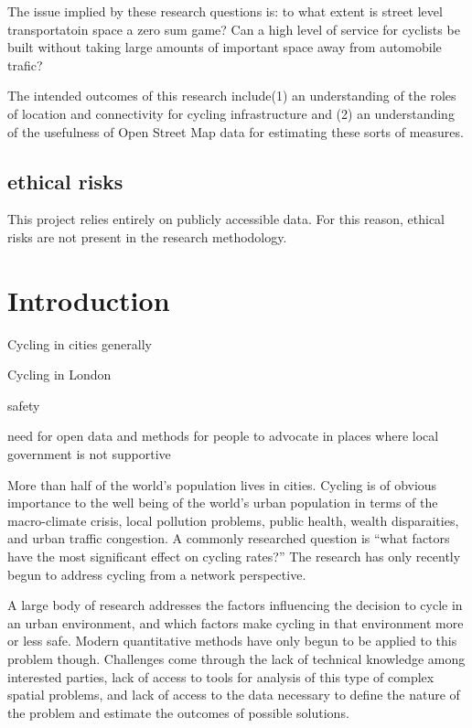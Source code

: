 \documentclass[11pt]{article} %
\begin{document}
The issue implied by these research questions is: to what extent is street level transportatoin space a zero sum game? Can a high level of service for cyclists be built without taking large amounts of important space away from automobile trafic? 

The intended outcomes of this research include(1) an understanding of the roles of location and connectivity for cycling infrastructure and (2) an understanding of the usefulness of Open Street Map data for estimating these sorts of measures. 


\subsection{ethical risks}

This project relies entirely on publicly accessible data. For this reason, ethical risks are not present in the research methodology.  

\section{Introduction}

Cycling in cities generally

Cycling in London

safety

need for open data and methods for people to advocate in places where local government is not supportive

More than half of the world's population lives in cities. Cycling is of obvious importance to the well being of the world's  urban population in terms of the macro-climate crisis, local pollution problems,  public health, wealth disparaities, and urban traffic congestion. A commonly researched question is ``what factors have the most significant effect on cycling rates?'' The research has only recently begun to address cycling from a network perspective. 

A large body of research addresses the factors influencing the decision to cycle in an urban environment, and which factors make cycling in that environment more or less safe. Modern quantitative methods have only begun to be applied to this problem though. Challenges come through the lack of technical knowledge among interested parties, lack of access to tools for analysis of this type of complex spatial problems, and lack of access to the data necessary to define the nature of the problem and estimate the outcomes of possible solutions. 
\end{document}
